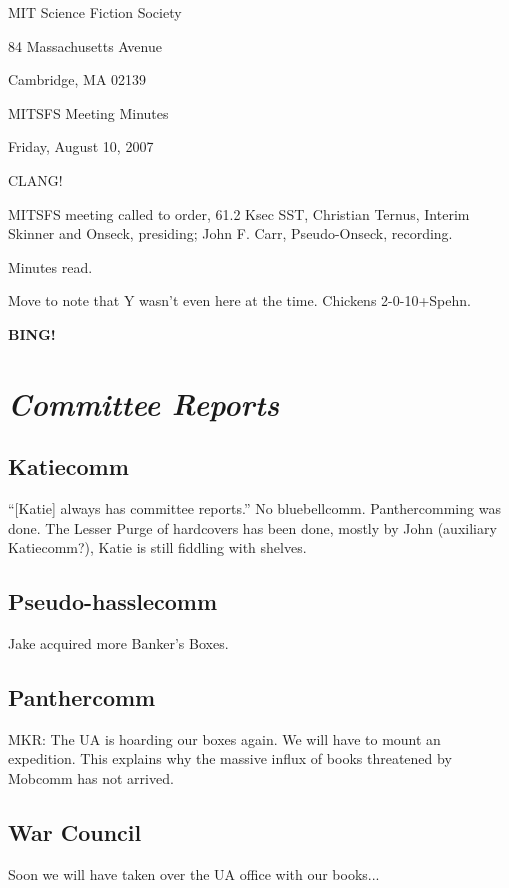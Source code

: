 \documentclass[10pt]{article}
\newcommand{\bing}{{\bf BING!} }
\newcommand{\goto}[1]{\bing \vskip 12pt \section*{{\em{#1}}}}
\begin{document}
\begin{center}

MIT Science Fiction Society

84 Massachusetts Avenue

Cambridge, MA 02139

\vspace{12pt}

MITSFS Meeting Minutes

Friday, August 10, 2007

\end{center}

\vspace{18pt}

\setlength{\parskip}{6pt}

\noindent
CLANG!

MITSFS meeting called to order, 61.2 Ksec SST,
Christian Ternus, Interim Skinner and Onseck, presiding;
John F. Carr, Pseudo-Onseck, recording.

Minutes read.

Move to note that Y wasn't even here at the time.  Chickens \hbox{2-0-10+Spehn}.

\goto{Committee Reports}

\subsection*{Katiecomm}
``[Katie] always has committee reports.''
No bluebellcomm.  Panthercomming was done.  The Lesser Purge of hardcovers
has been done, mostly by John (auxiliary Katiecomm?), Katie is still
fiddling with shelves.

\subsection*{Pseudo-hasslecomm}
Jake acquired more Banker's Boxes.

\subsection*{Panthercomm}
MKR: The UA is hoarding our boxes again.  We will have to mount an
expedition.  This explains why the massive influx of books threatened
by Mobcomm has not arrived.

\subsection*{War Council}
Soon we will have taken over the UA office with our books...
\end{document}
